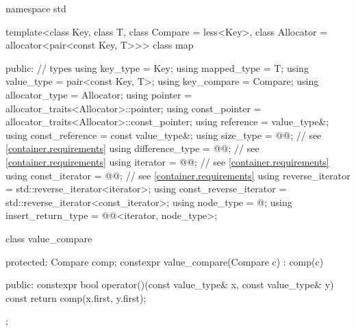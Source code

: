 %
%
\begin{codeblock}
namespace std {
  template<class Key, class T, class Compare = less<Key>,
           class Allocator = allocator<pair<const Key, T>>>
  class map {
  public:
    // types
    using key_type               = Key;
    using mapped_type            = T;
    using value_type             = pair<const Key, T>;
    using key_compare            = Compare;
    using allocator_type         = Allocator;
    using pointer                = allocator_traits<Allocator>::pointer;
    using const_pointer          = allocator_traits<Allocator>::const_pointer;
    using reference              = value_type&;
    using const_reference        = const value_type&;
    using size_type              = @@; // see \ref{container.requirements}
    using difference_type        = @@; // see \ref{container.requirements}
    using iterator               = @@; // see \ref{container.requirements}
    using const_iterator         = @@; // see \ref{container.requirements}
    using reverse_iterator       = std::reverse_iterator<iterator>;
    using const_reverse_iterator = std::reverse_iterator<const_iterator>;
    using node_type              = @\unspec@;
    using insert_return_type     = @@<iterator, node_type>;

    class value_compare {
    protected:
      Compare comp;
      constexpr value_compare(Compare c) : comp(c) {}

    public:
      constexpr bool operator()(const value_type& x, const value_type& y) const {
        return comp(x.first, y.first);
      }
    };

}}
\end{codeblock}
